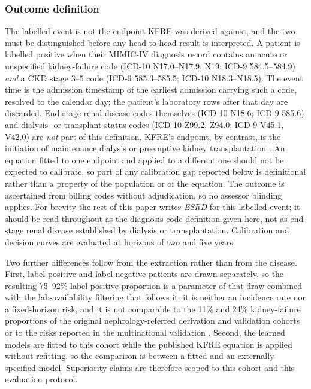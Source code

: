 \subsubsection{Outcome definition}\label{sec:outcome}
The labelled event is not the endpoint KFRE was derived against, and the two must be distinguished before any head-to-head result is interpreted. A patient is labelled positive when their MIMIC-IV diagnosis record contains an acute or unspecified kidney-failure code (ICD-10 N17.0--N17.9, N19; ICD-9 584.5--584.9) \emph{and} a CKD stage 3--5 code (ICD-9 585.3--585.5; ICD-10 N18.3--N18.5). The event time is the admission timestamp of the earliest admission carrying such a code, resolved to the calendar day; the patient's laboratory rows after that day are discarded. End-stage-renal-disease codes themselves (ICD-10 N18.6; ICD-9 585.6) and dialysis- or transplant-status codes (ICD-10 Z99.2, Z94.0; ICD-9 V45.1, V42.0) are \emph{not} part of this definition. KFRE's endpoint, by contrast, is the initiation of maintenance dialysis or preemptive kidney transplantation \citep{tangri2011predicting,tangri2016multinational}. An equation fitted to one endpoint and applied to a different one should not be expected to calibrate, so part of any calibration gap reported below is definitional rather than a property of the population or of the equation. The outcome is ascertained from billing codes without adjudication, so no assessor blinding applies. For brevity the rest of this paper writes \emph{ESRD} for this labelled event; it should be read throughout as the diagnosis-code definition given here, not as end-stage renal disease established by dialysis or transplantation. Calibration and decision curves are evaluated at horizons of two and five years.

Two further differences follow from the extraction rather than from the disease. First, label-positive and label-negative patients are drawn separately, so the resulting 75--92\% label-positive proportion is a parameter of that draw combined with the lab-availability filtering that follows it: it is neither an incidence rate nor a fixed-horizon risk, and it is not comparable to the 11\% and 24\% kidney-failure proportions of the original nephrology-referred derivation and validation cohorts \citep{tangri2011predicting} or to the risks reported in the multinational validation \citep{tangri2016multinational}. Second, the learned models are fitted to this cohort while the published KFRE equation is applied without refitting, so the comparison is between a fitted and an externally specified model. Superiority claims are therefore scoped to this cohort and this evaluation protocol.

